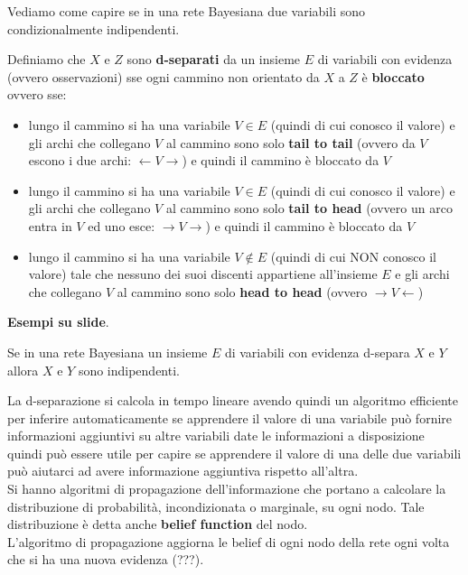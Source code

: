 \documentclass[a4paper,12pt, oneside]{book}
\begin{document}
Vediamo come capire se in una rete Bayesiana due variabili sono condizionalmente
indipendenti.
\begin{definizione}
  Definiamo che $X$ e $Z$ sono \textbf{d-separati} da un insieme $E$ di
  variabili con evidenza (ovvero osservazioni) sse ogni cammino non orientato da
  $X$ a $Z$ è \textbf{bloccato} ovvero sse:
  \begin{itemize}
    \item lungo il cammino si ha una variabile $V\in E$ (quindi di cui conosco
    il valore) e gli archi che
    collegano $V$ al cammino sono solo \textbf{tail to tail} (ovvero da $V$
    escono i 
    due archi: $\gets V\to$) e quindi il cammino è bloccato da $V$
    \item lungo il cammino si ha una variabile $V\in E$ (quindi di cui conosco
    il valore) e gli archi che
    collegano $V$ al cammino sono solo \textbf{tail to head} (ovvero un arco
    entra in 
    $V$ ed uno esce: $\to V\to$) e quindi il cammino è bloccato da $V$
    \item lungo il cammino si ha una variabile $V\not\in E$ (quindi di cui NON
    conosco il valore) tale che nessuno dei
    suoi discenti appartiene all'insieme $E$ e gli archi che
    collegano $V$ al cammino sono solo \textbf{head to head} (ovvero $\to V
    \gets$) 
  \end{itemize}
\end{definizione}
\textbf{Esempi su slide}.\\
\begin{teorema}
  Se in una rete Bayesiana un insieme $E$ di variabili con evidenza d-separa $X$
  e $Y$ allora $X$ e $Y$ sono indipendenti.
\end{teorema}
La d-separazione si calcola in tempo lineare avendo quindi un algoritmo
efficiente per inferire automaticamente se apprendere il valore di una variabile
può fornire informazioni aggiuntivi su altre variabili date le informazioni a
disposizione quindi può essere utile per capire se apprendere il valore di una
delle due variabili può aiutarci ad avere informazione aggiuntiva rispetto
all’altra.\\ 
Si hanno algoritmi di propagazione dell'informazione che portano a calcolare la
distribuzione di probabilità, incondizionata o marginale, su ogni nodo. Tale
distribuzione è detta anche \textbf{belief function} del nodo. \\
L'algoritmo di propagazione aggiorna le belief di ogni nodo della rete ogni
volta che si ha una nuova evidenza (???).\\
\end{document}
